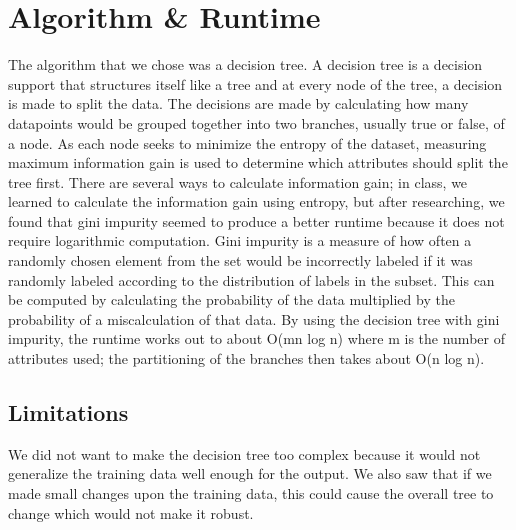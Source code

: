 \documentclass[]{report}
\begin{document}
	\section{Algorithm \& Runtime}
	The algorithm that we chose was a decision tree. A decision tree is a decision support that structures itself like a tree and at every node of the tree, a decision is made to split the data. The decisions are made by calculating how many datapoints would be grouped together into two branches, usually true or false, of a node. As each node seeks to minimize the entropy of the dataset, measuring maximum information gain is used to determine which attributes should split the tree first. There are several ways to calculate information gain; in class, we learned to calculate the information gain using entropy, but after researching, we found that gini impurity seemed to produce a better runtime because it does not require logarithmic computation. Gini impurity is a measure of how often a randomly chosen element from the set would be incorrectly labeled if it was randomly labeled according to the distribution of labels in the subset. This can be computed by calculating the probability of the data multiplied by the probability of a miscalculation of that data.
	By using the decision tree with gini impurity, the runtime works out to about O(mn log n) where m is the number of attributes used; the partitioning of the branches then takes about O(n log n).
	\subsection{Limitations}
	We did not want to make the decision tree too complex because it would not generalize the training data well enough for the output. We also saw that if we made small changes upon the training data, this could cause the overall tree to change which would not make it robust.
	
\end{document}
